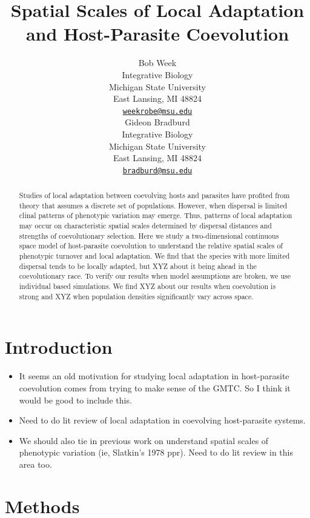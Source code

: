 \documentclass{article}
\title{Spatial Scales of Local Adaptation and Host-Parasite Coevolution}
\author{
    Bob Week
   \\
    Integrative Biology \\
    Michigan State University \\
  East Lansing, MI 48824 \\
  \texttt{\href{mailto:weekrobe@msu.edu}{\nolinkurl{weekrobe@msu.edu}}} \\
   \And
    Gideon Bradburd
   \\
    Integrative Biology \\
    Michigan State University \\
  East Lansing, MI 48824 \\
  \texttt{\href{mailto:bradburd@msu.edu}{\nolinkurl{bradburd@msu.edu}}} \\
  }
\begin{document}
\maketitle

\def\tightlist{}


\begin{abstract}
Studies of local adaptation between coevolving hosts and parasites have
profited from theory that assumes a discrete set of populations.
However, when dispersal is limited clinal patterns of phenotypic
variation may emerge. Thus, patterns of local adaptation may occur on
characteristic spatial scales determined by dispersal distances and
strengths of coevolutionary selection. Here we study a two-dimensional
continuous space model of host-parasite coevolution to understand the
relative spatial scales of phenotypic turnover and local adaptation. We
find that the species with more limited dispersal tends to be locally
adapted, but XYZ about it being ahead in the coevolutionary race. To
verify our results when model assumptions are broken, we use individual
based simulations. We find XYZ about our results when coevolution is
strong and XYZ when population densities significantly vary across
space.
\end{abstract}


\hypertarget{introduction}{%
\section{Introduction}\label{introduction}}

\begin{itemize}
\item
  It seems an old motivation for studying local adaptation in
  host-parasite coevolution comes from trying to make sense of the GMTC.
  So I think it would be good to include this.
\item
  Need to do lit review of local adaptation in coevolving host-parasite
  systems.
\item
  We should also tie in previous work on understand spatial scales of
  phenotypic variation (ie, Slatkin's 1978 ppr). Need to do lit review
  in this area too.
\end{itemize}

\hypertarget{methods}{%
\section{Methods}\label{methods}}
\end{document}
